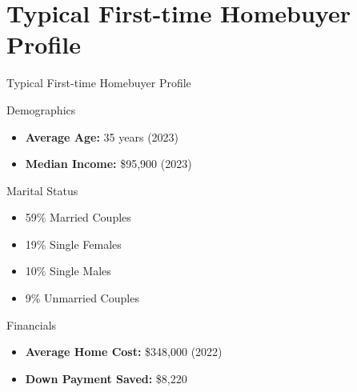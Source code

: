 \documentclass{beamer}
\begin{document}
\section{Typical First-time Homebuyer Profile}
\begin{frame}{Typical First-time Homebuyer Profile}
    \begin{block}{Demographics}
        \begin{itemize}
            \item \textbf{Average Age:} 35 years (2023)
            \item \textbf{Median Income:} \$95,900 (2023)
        \end{itemize}
    \end{block}
    \begin{block}{Marital Status}
        \begin{itemize}
            \item 59\% Married Couples
            \item 19\% Single Females
            \item 10\% Single Males
            \item 9\% Unmarried Couples
        \end{itemize}
    \end{block}
    \begin{block}{Financials}
        \begin{itemize}
            \item \textbf{Average Home Cost:} \$348,000 (2022)
            \item \textbf{Down Payment Saved:} \$8,220
        \end{itemize}
    \end{block}
\end{frame}
\end{document}
